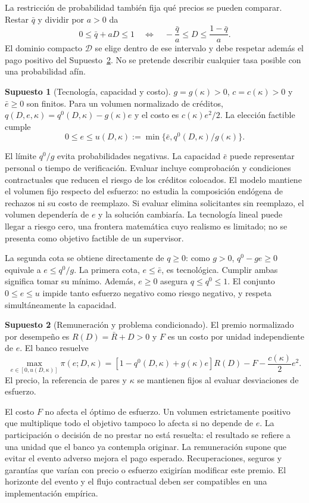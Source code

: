 \documentclass[11pt]{article}
\theoremstyle{definition}\newtheorem{assumption}{Supuesto}
\begin{document}
La restricción de probabilidad también fija qué precios se pueden comparar.
Restar $\bar q$ y dividir por $a>0$ da
\[
0\le\bar q+aD\le1
\quad\Longleftrightarrow\quad
-\frac{\bar q}{a}\le D\le\frac{1-\bar q}{a}.
\]
El dominio compacto $\mathcal D$ se elige dentro de ese intervalo y debe
respetar además el pago positivo del Supuesto~\ref{as:payoff}. No se pretende
describir cualquier tasa posible con una probabilidad afín.

\begin{assumption}[Tecnología, capacidad y costo]\label{as:technology}
$g=g(\kappa)>0$, $c=c(\kappa)>0$ y $\bar e\ge0$ son finitos. Para un volumen
normalizado de créditos, $q(D,e,\kappa)=q^0(D,\kappa)-g(\kappa)e$ y el costo
es $c(\kappa)e^2/2$. La elección factible cumple
\[
0\le e\le u(D,\kappa):=\min\{\bar e,q^0(D,\kappa)/g(\kappa)\}.
\]
\end{assumption}
El límite $q^0/g$ evita probabilidades negativas. La capacidad $\bar e$ puede
representar personal o tiempo de verificación. Evaluar incluye comprobación
y condiciones contractuales que reducen el riesgo de los créditos colocados.
El modelo mantiene el volumen fijo respecto del esfuerzo: no estudia la
composición endógena de rechazos ni su costo de reemplazo. Si evaluar elimina
solicitantes sin reemplazo, el volumen dependería de $e$ y la solución cambiaría.
La tecnología lineal puede llegar a riesgo cero, una frontera matemática cuyo
realismo es limitado; no se presenta como objetivo factible de un supervisor.

La segunda cota se obtiene directamente de $q\ge0$: como $g>0$,
$q^0-ge\ge0$ equivale a $e\le q^0/g$. La primera cota, $e\le\bar e$,
es tecnológica. Cumplir ambas significa tomar su mínimo. Además, $e\ge0$
asegura $q\le q^0\le1$. El conjunto $0\le e\le u$ impide tanto esfuerzo
negativo como riesgo negativo, y respeta simultáneamente la capacidad.

\begin{assumption}[Remuneración y problema condicionado]\label{as:payoff}
El premio normalizado por desempeño es $R(D)=\bar R+D>0$ y $F$ es un costo
por unidad independiente de $e$. El banco resuelve
\begin{equation}\label{eq:problem}
\max_{e\in[0,u(D,\kappa)]}\pi(e;D,\kappa)
=[1-q^0(D,\kappa)+g(\kappa)e]R(D)-F-\frac{c(\kappa)}2e^2.
\end{equation}
El precio, la referencia de pares y $\kappa$ se mantienen fijos al evaluar
desviaciones de esfuerzo.
\end{assumption}
El costo $F$ no afecta el óptimo de esfuerzo. Un volumen estrictamente
positivo que multiplique todo el objetivo tampoco lo afecta si no depende
de $e$. La participación o decisión de no prestar no está resuelta: el
resultado se refiere a una unidad que el banco ya contempla originar.
La remuneración supone que evitar el evento adverso mejora el pago esperado.
Recuperaciones, seguros y garantías que varían con precio o esfuerzo exigirían
modificar este premio. El horizonte del evento y el flujo contractual deben
ser compatibles en una implementación empírica.
\end{document}
